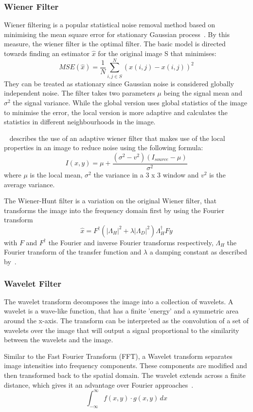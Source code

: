 \documentclass[a4paper, 12pt]{report}
\begin{document}
\subsubsection{Wiener Filter}
Wiener filtering is a popular statistical noise removal method based on
minimising the mean square error for stationary Gaussian
process~\cite{jin2003adaptive}. By this measure, the wiener filter is the
optimal filter. The basic model is directed towards finding an estimator
\(\hat{x}\) for the original image S that minimises:
\[MSE(\hat{x})=\frac{1}{N} \sum_{i,j\in S}^{N}(\hat{x}(i,j)-x(i,j))^2\]
They can be treated as stationary since Gaussian noise is considered globally
independent noise. The filter takes two parameters \(\mu\) being the signal
mean and \(\sigma^2\) the signal variance. While the global version uses global
statistics of the image to minimise the error, the local version is more
adaptive and calculates the statistics in different neighbourhoods in the
image.
\par

~\cite{gatos2006adaptive} describes the use of an adaptive wiener filter that makes use of the local properties in an image to reduce noise using the following formula:
\[I(x,y)=\mu+\frac{(\sigma^2-v^2)(I_{source}-\mu)}{\sigma^2}\]
where \(\mu\) is the local mean, \(\sigma^2\) the variance in a 3 x 3 window
and \(v^2\) is the average variance.
\par
The Wiener-Hunt filter is a variation on the original Wiener filter, that
transforms the image into the frequency domain first by using the Fourier
transform
\[\hat x = F^\dagger (|\Lambda_H|^2 + \lambda |\Lambda_D|^2)
    \Lambda_H^\dagger F y\]
with \(F\) and \(F^\dagger\) the Fourier and inverse Fourier transforms
respectively, \(\Lambda_H\) the Fourier transform of the transfer function and
\(\lambda\) a damping constant as described by~\cite{scikit-image}.

\subsubsection{Wavelet Filter}
The wavelet transform decomposes the image into a collection of wavelets. A
wavelet is a wave-like function, that has a finite 'energy' and a symmetric
area around the x-axis. The transform can be interpreted as the convolution of
a set of wavelets over the image that will output a signal proportional to the
similarity between the wavelets and the image.\par

Similar to the Fast Fourier Transform (FFT), a Wavelet transform separates
image intensities into frequency components. These components are modified and
then transformed back to the spatial domain. The wavelet extends across a
finite distance, which gives it an advantage over Fourier
approaches~\cite{wavelet_filtering_2022}.
\[ \int_{-\infty}^{\infty} f(x,y) \cdot g(x,y) \,dx \]
\end{document}
